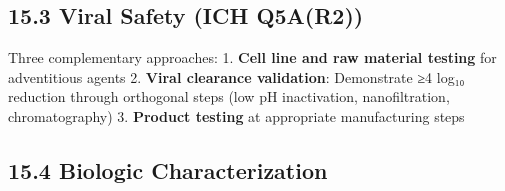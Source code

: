 \documentclass[
  11pt,
  a4paper,
]{report}
\begin{document}
\hypertarget{viral-safety-ich-q5ar2}{%
\subsection{15.3 Viral Safety (ICH
Q5A(R2))}\label{viral-safety-ich-q5ar2}}

Three complementary approaches: 1. \textbf{Cell line and raw material
testing} for adventitious agents 2. \textbf{Viral clearance validation}:
Demonstrate ≥4 log₁₀ reduction through orthogonal steps (low pH
inactivation, nanofiltration, chromatography) 3. \textbf{Product
testing} at appropriate manufacturing steps

\hypertarget{biologic-characterization}{%
\subsection{15.4 Biologic
Characterization}\label{biologic-characterization}}
\end{document}
